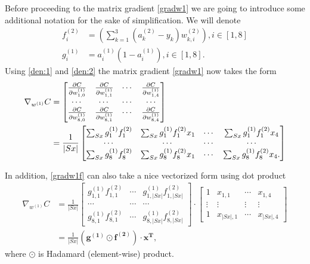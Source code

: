 \documentclass[a4paper,12pt,notitlepage]{article}
\begin{document}
Before proceeding to the matrix gradient \eqref{gradw1} we are going to introduce some additional notation for the sake of simplification. We will denote
\begin{subequations}
\begin{align}
f_{i}^{(2)}&=\left(\sum_{k=1}^{3} (a_{k}^{(2)}-y_{k})w_{k,i}^{(2)}\right ), i \in [1,8] \label{den:1}\\
g_{i}^{(1)}&=a_{i}^{(1)}(1-a_{i}^{(1)}), i \in [1,8]. \label{den:2}
\end{align}
\end{subequations}
Using \eqref{den:1} and \eqref{den:2} the matrix gradient \eqref{gradw1} now takes the form
\begin{align} \label{gradw1f}
\nabla_{w^{(1)}}C
&=\begin{bmatrix}
 \frac{\partial C}{\partial w_{1,0}^{(1)}}& \frac{\partial C}{\partial w_{1,1}^{(1)}} &\cdots &\frac{\partial C}{\partial w_{1,4}^{(1)}}\\ 
 \cdots&\cdots&\cdots&\cdots \\
 \frac{\partial C}{\partial w_{8,0}^{(1)}}& \frac{\partial C}{\partial w_{8,1}^{(1)}} &\cdots &\frac{\partial C}{\partial w_{8,4}^{(1)}}\\ 
 \end{bmatrix} \notag \\
&=\frac{1}{|Sx|}\begin{bmatrix}
 \sum_{Sx}g_{1}^{(1)}f_{1}^{(2)}&\sum_{Sx}g_{1}^{(1)}f_{1}^{(2)}x_{1}  &\cdots  &\sum_{Sx}g_{1}^{(1)}f_{1}^{(2)}x_{4} \\ 
 \cdots & \cdots & \cdots & \cdots\\ 
 \sum_{Sx}g_{8}^{(1)}f_{8}^{(2)}& \sum_{Sx}g_{8}^{(1)}f_{8}^{(2)}x_{1} & \cdots & \sum_{Sx}g_{8}^{(1)}f_{8}^{(2)}x_{4}. 
\end{bmatrix}
\end{align}

In addition, \eqref{gradw1f} can also take a nice vectorized form using dot product
\begin{equation} \label{gradw1f2}
\begin{split}
\nabla_{w^{(1)}}C
&=\frac{1}{|Sx|}\begin{bmatrix}
 g_{1,1}^{(1)}f_{1,1}^{(2)}& \cdots & g_{1,|Sx|}^{(1)}f_{1,|Sx|}^{(2)}\\ 
 \cdots& \cdots & \cdots\\ 
 g_{8,1}^{(1)}f_{8,1}^{(2)}& \cdots & g_{8,|Sx|}^{(1)}f_{8,|Sx|}^{(2)}
\end{bmatrix}\cdot\begin{bmatrix}
 1& x_{1,1} & \cdots & x_{1,4}\\ 
 \vdots& \vdots & \vdots & \vdots \\ 
 1& x_{|Sx|,1} & \cdots & x_{|Sx|,4}
\end{bmatrix}\\
&=\frac{1}{|Sx|}\left(\mathbf{g^{(1)}}\odot\mathbf{f^{(2)}} \right )\cdot \mathbf{x^{T}},
\end{split}
\end{equation}
where $\odot$ is Hadamard (element-wise) product.
\end{document}

